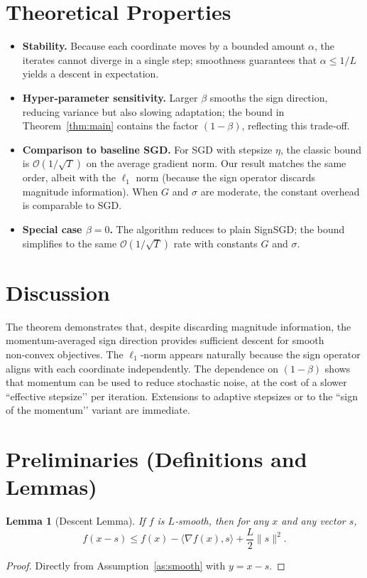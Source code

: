 \documentclass{article}
\newtheorem{lemma}{Lemma}
\begin{document}
\section*{Theoretical Properties}
\begin{itemize}
\item \textbf{Stability.} Because each coordinate moves by a bounded amount $\alpha$, the iterates cannot diverge in a single step; smoothness guarantees that $\alpha\le 1/L$ yields a descent in expectation.
\item \textbf{Hyper‑parameter sensitivity.} Larger $\beta$ smooths the sign direction, reducing variance but also slowing adaptation; the bound in Theorem~\ref{thm:main} contains the factor $(1-\beta)$, reflecting this trade‑off.
\item \textbf{Comparison to baseline SGD.} For SGD with stepsize $\eta$, the classic bound is $\mathcal{O}(1/\sqrt{T})$ on the average gradient norm. Our result matches the same order, albeit with the $\ell_{1}$ norm (because the sign operator discards magnitude information). When $G$ and $\sigma$ are moderate, the constant overhead is comparable to SGD.
\item \textbf{Special case $\beta=0$.} The algorithm reduces to plain SignSGD; the bound simplifies to the same $\mathcal{O}(1/\sqrt{T})$ rate with constants $G$ and $\sigma$.
\end{itemize}

\section*{Discussion}
The theorem demonstrates that, despite discarding magnitude information, the momentum‑averaged sign direction provides sufficient descent for smooth non‑convex objectives. The $\ell_{1}$‑norm appears naturally because the sign operator aligns with each coordinate independently. The dependence on $(1-\beta)$ shows that momentum can be used to reduce stochastic noise, at the cost of a slower “effective stepsize’’ per iteration. Extensions to adaptive stepsizes or to the “sign of the momentum’’ variant are immediate.

\newpage
\section*{Preliminaries (Definitions and Lemmas)}
\begin{lemma}[Descent Lemma]\label{lem:descent}
If $f$ is $L$‑smooth, then for any $x$ and any vector $s$,
\[
f(x-s)\le f(x)-\langle \nabla f(x),s\rangle+\frac{L}{2}\|s\|^{2}.
\]
\end{lemma}
\begin{proof}
Directly from Assumption~\ref{as:smooth} with $y=x-s$.
\end{proof}
\end{document}
